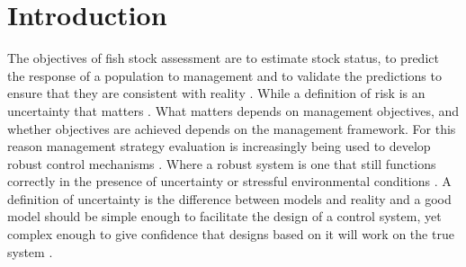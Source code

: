 \documentclass[%
nonumbib,      %
%
]{nrc1}                          %
\begin{document}
\newpage


\section*{Introduction}


The objectives of fish stock assessment are to estimate stock status, to predict the response of a population to management and to validate the predictions to ensure that they are consistent with reality \citep{kell2015xval}. While a definition of risk is an uncertainty that matters \citep{hillson2010exploiting}. What matters depends on management objectives, and whether objectives are achieved depends on the management framework. For this reason management strategy evaluation \citep[MSE][]{kell2006operationa,punt2014management,carruthers2015simple} is increasingly being used to develop robust control mechanisms \citep[e.g.][]{rohrs1985robustness}. Where a robust system is one that still functions correctly in the presence of uncertainty or stressful environmental conditions \citep{radatz1990ieee}. A definition of uncertainty is the difference between models and reality \citep{chang2014robust} and a good model should be simple enough to facilitate the design of a control system, yet complex enough to give confidence that designs based on it will work on the true system \citep{zhou1996robust}.
\end{document}
